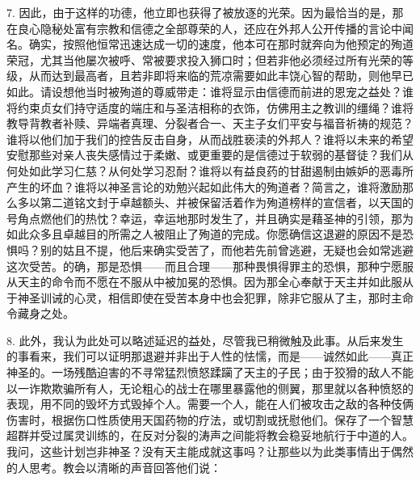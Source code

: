 7. 因此，由于这样的功德，他立即也获得了被放逐的光荣。因为最恰当的是，那在良心隐秘处富有宗教和信德之全部尊荣的人，还应在外邦人公开传播的言论中闻名。确实，按照他恒常迅速达成一切的速度，他本可在那时就奔向为他预定的殉道荣冠，尤其当他屡次被呼、常被要求投入狮口时；但若非他必须经过所有光荣的等级，从而达到最高者，且若非即将来临的荒凉需要如此丰饶心智的帮助，则他早已如此。请设想他当时被殉道的尊威带走：谁将显示由信德而前进的恩宠之益处？谁将约束贞女们持守适度的端庄和与圣洁相称的衣饰，仿佛用主之教训的缰绳？谁将教导背教者补赎、异端者真理、分裂者合一、天主子女们平安与福音祈祷的规范？谁将以他们加于我们的控告反击自身，从而战胜亵渎的外邦人？谁将以未来的希望安慰那些对亲人丧失感情过于柔嫩、或更重要的是信德过于软弱的基督徒？我们从何处如此学习仁慈？从何处学习忍耐？谁将以有益良药的甘甜遏制由嫉妒的恶毒所产生的坏血？谁将以神圣言论的劝勉兴起如此伟大的殉道者？简言之，谁将激励那么多以第二道铭文封于卓越额头、并被保留活着作为殉道榜样的宣信者，以天国的号角点燃他们的热忱？幸运，幸运地那时发生了，并且确实是藉圣神的引领，那为如此众多且卓越目的所需之人被阻止了殉道的完成。你愿确信这退避的原因不是恐惧吗？别的姑且不提，他后来确实受苦了，而他若先前曾逃避，无疑也会如常逃避这次受苦。的确，那是恐惧——而且合理——那种畏惧得罪主的恐惧，那种宁愿服从天主的命令而不愿在不服从中被加冕的恐惧。因为那全心奉献于天主并如此服从于神圣训诫的心灵，相信即使在受苦本身中也会犯罪，除非它服从了主，那时主命令藏身之处。\par

8. 此外，我认为此处可以略述延迟的益处，尽管我已稍微触及此事。从后来发生的事看来，我们可以证明那退避并非出于人性的怯懦，而是——诚然如此——真正神圣的。一场残酷迫害的不寻常猛烈愤怒蹂躏了天主的子民；由于狡猾的敌人不能以一诈欺欺骗所有人，无论粗心的战士在哪里暴露他的侧翼，那里就以各种愤怒的表现，用不同的毁坏方式毁掉个人。需要一个人，能在人们被攻击之敌的各种伎俩伤害时，根据伤口性质使用天国药物的疗法，或切割或抚慰他们。保存了一个智慧超群并受过属灵训练的，在反对分裂的涛声之间能将教会稳妥地航行于中道的人。我问，这些计划岂非神圣？没有天主能成就这事吗？让那些以为此类事情出于偶然的人思考。教会以清晰的声音回答他们说：\par

